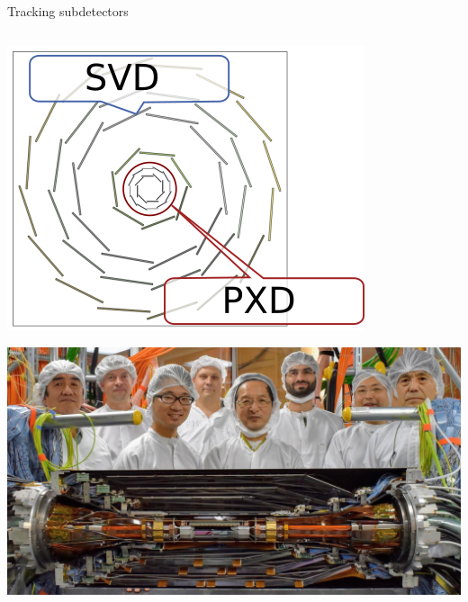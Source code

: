 \documentclass[presentation]{etp-beamer-fancy}
\begin{document}
\begin{frame}[label={sec:org169fa11}]{Tracking subdetectors}
\begin{columns}
\begin{column}{0.5\columnwidth}
\begin{center}
\includegraphics[width=.9\linewidth]{./figures/vxd_layers_labelled.png}
\end{center}
\begin{center}
\includegraphics[width=.9\linewidth]{./figures/vertexdetector_cropped.jpg}
\end{center}
\end{column}
\end{columns}
\end{frame}
\end{document}
